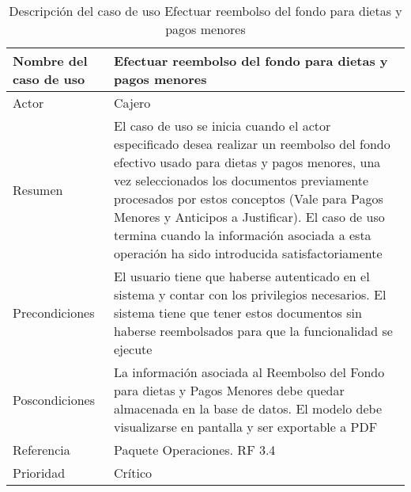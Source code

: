 \begin{table}[H]
	\sf
	\begin{supertabular}{|p{4.5cm}|p{12cm}|}
		\hline
		\textbf{Nombre del caso de uso}
		& \textbf{Efectuar reembolso del fondo para dietas y pagos menores} \\ \hline
		
		Actor
		& Cajero \\ \hline
		
		Resumen
		& El caso de uso se inicia cuando el actor especificado desea realizar un reembolso del fondo efectivo usado para dietas y pagos menores, una vez seleccionados los documentos previamente procesados por estos conceptos (Vale para Pagos Menores y Anticipos a Justificar). El caso de uso termina cuando la información asociada a esta operación ha sido introducida satisfactoriamente \\ \hline
		
		Precondiciones
		& El usuario tiene que haberse autenticado en el sistema y contar con los privilegios necesarios. El sistema tiene que tener estos documentos sin haberse reembolsados para que la funcionalidad se ejecute \\ \hline
		
		Poscondiciones
		& La información asociada al Reembolso del Fondo para dietas y Pagos Menores debe quedar almacenada en la base de datos. El modelo debe visualizarse en pantalla y ser exportable a PDF \\ \hline
		
		Referencia
		& Paquete Operaciones. RF 3.4 \\ \hline
		
		Prioridad
		& Crítico \\		
		\hline
	\end{supertabular}
	\caption[Descripción del caso de uso Efectuar reembolso del fondo para dietas y pagos menores]{Descripción del caso de uso Efectuar reembolso del fondo para dietas y pagos menores}
	\label{table:CU_EfectReemb}
\end{table}

